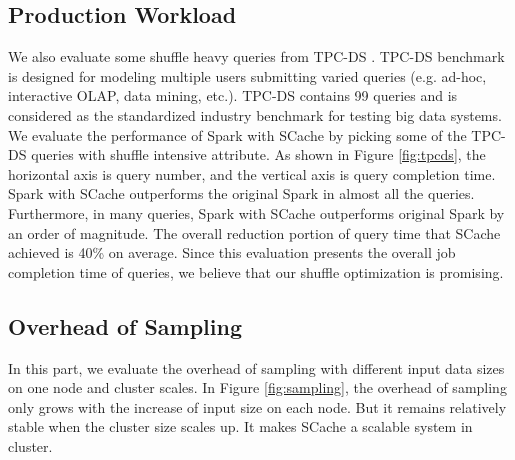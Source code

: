 \subsection{Production Workload}
We also evaluate some shuffle heavy queries from TPC-DS \cite{tpcds}. TPC-DS benchmark is designed for modeling multiple users submitting varied queries (e.g. ad-hoc, interactive OLAP, data mining, etc.). TPC-DS contains 99 queries and is considered as the standardized industry benchmark for testing big data systems. We evaluate the performance of Spark with SCache by picking some of the TPC-DS queries with shuffle intensive attribute. 
As shown in Figure \ref{fig:tpcds}, the horizontal axis is query number, and the vertical axis is query completion time. Spark with SCache outperforms the original Spark in almost all the queries. Furthermore, in many queries, Spark with SCache outperforms original Spark by an order of magnitude. The overall reduction portion of query time that SCache achieved is 40\% on average. Since this evaluation presents the overall job completion time of queries, we believe that our shuffle optimization is promising.
\subsection{Overhead of Sampling}
In this part, we evaluate the overhead of sampling with different input data sizes on one node and cluster scales. In Figure \ref{fig:sampling}, the overhead of sampling only grows with the increase of input size on each node. But it remains relatively stable when the cluster size scales up. It makes SCache a scalable system in cluster.
